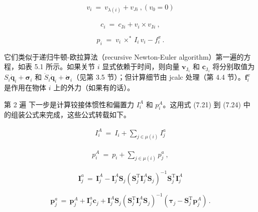 \documentclass[10pt,a4paper]{book}
\theoremstyle{thmstyle} %
\theoremstyle{defstyle} %
\theoremstyle{prostyle} %
\begin{document}
$$
\begin{array}{r} { v _ { i } \ = \ v _ { \lambda ( i ) } + v _ { J i } \ ,  \left( v _ { 0 } = 0 \right) } \end{array}
$$



$$
c _ { i } \ = \ c _ { \mathrm { J } i } + v _ { i } \times v _ { \mathrm { J } i } \ ,
$$



$$
p _ { i } \; = \; v _ { i } \, \times ^{*} \, I _ { i } \, v _ { i } - f _ { i } ^{x} \, .
$$



它们类似于递归牛顿-欧拉算法（recursive Newton-Euler algorithm）第一遍的方程，如表 5.1 所示。如果关节 $i$ 显式依赖于时间，则向量 $\boldsymbol{v}_{\mathrm{J}_{i}}$ 和 $\boldsymbol{c}_{\mathrm{J}_{i}}$ 将分别取值为 $S_{i} \dot{\boldsymbol{q}}_{i}+\boldsymbol{\sigma}_{i}$ 和 $\dot{S}_{i} \dot{\boldsymbol{q}}_{i}+\dot{\boldsymbol{\sigma}}_{i}$（见第 3.5 节）；但计算细节由 jcalc 处理（第 4.4 节）。$\boldsymbol{f}_{i}^{x}$ 是作用在物体 $i$ 上的外力（如果有的话）。



第 2 遍 下一步是计算铰接体惯性和偏置力 $I_{i}^{A}$ 和 $p_{i}^{A}$。这用式 (7.21) 到 (7.24) 中的组装公式来完成，这些公式转载如下。



$$
\begin{array}{r} { I _ { i } ^{A} \ = \ I _ { i } + \sum _ { j \in \mu ( i ) } I _ { j } ^{a} } \end{array}
$$



$$
\begin{array}{r} { p _ { i } ^{A} \ = \ p _ { i } + \sum _ { j \in \mu ( i ) } p _ { j } ^{a} \ , } \end{array}
$$



$$
\boldsymbol{ I } _ { j } ^{a} \, = \, \boldsymbol{ I } _ { j } ^{A} - \boldsymbol{ I } _ { j } ^{A} \boldsymbol{ S } _ { j } ( \boldsymbol{ S } _ { j } ^{\mathrm { T} } \boldsymbol{ I } _ { j } ^{A} \boldsymbol{ S } _ { j } ) ^{- 1} \boldsymbol{ S } _ { j } ^{\mathrm { T} } \boldsymbol{ I } _ { j } ^{A}
$$



$$
\boldsymbol{ p } _ { j } ^{a} \, = \, \boldsymbol{ p } _ { j } ^{A} + \boldsymbol{ I } _ { j } ^{a} \boldsymbol{ c } _ { j } + \boldsymbol{ I } _ { j } ^{A} \boldsymbol{ S } _ { j } ( \boldsymbol{ S } _ { j } ^{\mathrm { T} } \boldsymbol{ I } _ { j } ^{A} \boldsymbol{ S } _ { j } ) ^{- 1} ( \boldsymbol{ \tau } _ { j } - \boldsymbol{ S } _ { j } ^{\mathrm { T} } \boldsymbol{ p } _ { j } ^{A} ) \, .
$$
\end{document}
